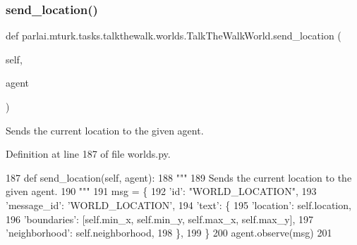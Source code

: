\mbox{\label{classparlai_1_1mturk_1_1tasks_1_1talkthewalk_1_1worlds_1_1TalkTheWalkWorld_a0585864180ed00a891a8a2fc549ebfcf}} 
\subsubsection{\texorpdfstring{send\+\_\+location()}{send\_location()}}
{\footnotesize\ttfamily def parlai.\+mturk.\+tasks.\+talkthewalk.\+worlds.\+Talk\+The\+Walk\+World.\+send\+\_\+location (\begin{DoxyParamCaption}\item[{}]{self,  }\item[{}]{agent }\end{DoxyParamCaption})}

\begin{DoxyVerb}Sends the current location to the given agent.
\end{DoxyVerb}
 

Definition at line 187 of file worlds.\+py.


\begin{DoxyCode}
187     \textcolor{keyword}{def }send\_location(self, agent):
188         \textcolor{stringliteral}{"""}
189 \textcolor{stringliteral}{        Sends the current location to the given agent.}
190 \textcolor{stringliteral}{        """}
191         msg = \{
192             \textcolor{stringliteral}{'id'}: \textcolor{stringliteral}{"WORLD\_LOCATION"},
193             \textcolor{stringliteral}{'message\_id'}: \textcolor{stringliteral}{'WORLD\_LOCATION'},
194             \textcolor{stringliteral}{'text'}: \{
195                 \textcolor{stringliteral}{'location'}: self.location,
196                 \textcolor{stringliteral}{'boundaries'}: [self.min\_x, self.min\_y, self.max\_x, self.max\_y],
197                 \textcolor{stringliteral}{'neighborhood'}: self.neighborhood,
198             \},
199         \}
200         agent.observe(msg)
201 
\end{DoxyCode}
\mbox{\label{classparlai_1_1mturk_1_1tasks_1_1talkthewalk_1_1worlds_1_1TalkTheWalkWorld_a60b3eed2e7c28c3339498c83ebb7d269}} 
